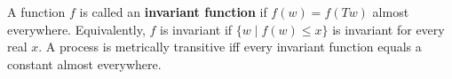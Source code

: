A function $f$ is called an \textbf{invariant function} if $f(w) = f(Tw)$ almost everywhere. Equivalently, $f$ is invariant if $\{w \mid f(w) \leq x\}$ is invariant for every real $x$. A process is metrically transitive iff every invariant function equals a constant almost everywhere.
